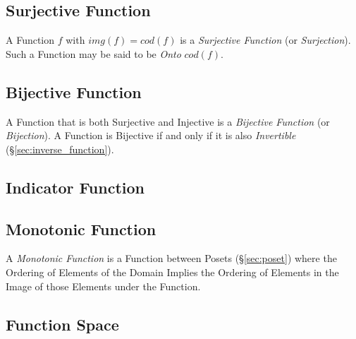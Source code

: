 \subsection{Surjective Function}\label{sec:surjective_function}

A Function $f$ with $img(f) = cod(f)$ is a \emph{Surjective Function}
(or \emph{Surjection}). Such a Function may be said to be \emph{Onto}
$cod(f)$.



\subsection{Bijective Function}\label{sec:bijective_function}

A Function that is both Surjective and Injective is a \emph{Bijective
  Function} (or \emph{Bijection}). A Function is Bijective if and only
if it is also \emph{Invertible} (\S\ref{sec:inverse_function}).



\subsection{Indicator Function}\label{sec:indicator_function}

\subsection{Monotonic Function}\label{sec:monotonic}

A \emph{Monotonic Function} is a Function between Posets
(\S\ref{sec:poset}) where the Ordering of Elements of the Domain
Implies the Ordering of Elements in the Image of those Elements under
the Function.



\subsection{Function Space}\label{sec:function_space}

